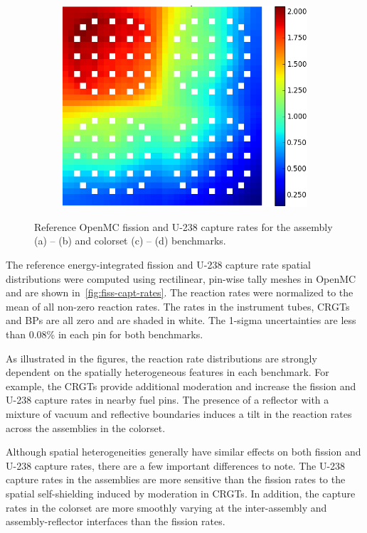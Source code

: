 \begin{figure}[h!]
\begin{subfigure}{0.4\textwidth}
  \caption{}
  \label{fig:fiss-reflector}
\end{subfigure}%
\begin{subfigure}{0.4\textwidth}
  \centering
  \includegraphics[width=0.8\linewidth]{figures/reflector/capture-rates}
  \caption{}
  \label{fig:capt-reflector}
\end{subfigure}
\caption{Reference OpenMC fission and U-238 capture rates for the assembly (a) -- (b) and colorset (c) -- (d) benchmarks.}
\label{fig:fiss-capt-rates}
\end{figure}

The reference energy-integrated fission and U-238 capture rate spatial distributions were computed using rectilinear, pin-wise tally meshes in OpenMC and are shown in~\autoref{fig:fiss-capt-rates}. The reaction rates were normalized to the mean of all non-zero reaction rates. The rates in the instrument tubes, CRGTs and BPs are all zero and are shaded in white. The 1-sigma uncertainties are less than 0.08\% in each pin for both benchmarks.


As illustrated in the figures, the reaction rate distributions are strongly dependent on the spatially heterogeneous features in each benchmark. For example, the CRGTs provide additional moderation and increase the fission and U-238 capture rates in nearby fuel pins. The presence of a reflector with a mixture of vacuum and reflective boundaries induces a tilt in the reaction rates across the assemblies in the colorset.

Although spatial heterogeneities generally have similar effects on both fission and U-238 capture rates, there are a few important differences to note. The U-238 capture rates in the assemblies are more sensitive than the fission rates to the spatial self-shielding induced by moderation in CRGTs. In addition, the capture rates in the colorset are more smoothly varying at the inter-assembly and assembly-reflector interfaces than the fission rates.
